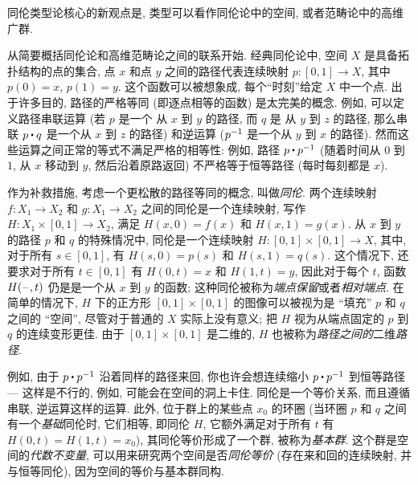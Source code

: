同伦类型论核心的新观点是, 类型可以看作同伦论中的空间, 或者范畴论中的高维广群.

从简要概括同伦论和高维范畴论之间的联系开始.
经典同伦论中, 空间 $X$ 是具备拓扑结构的点的集合,
%
%
点 $x$ 和点 $y$ 之间的路径代表连续映射 $p : [0,1] \to X$, 其中 $p(0) = x$, $p(1) = y$.
%
%
这个函数可以被想象成, 每个``时刻''给定 $X$ 中一个点.
出于许多目的, 路径的严格等同 (即逐点相等的函数) 是太完美的概念.
例如, 可以定义路径串联运算 (若 $p$ 是一个 从 $x$ 到 $y$ 的路径, 而 $q$ 是 从 $y$ 到 $z$ 的路径, 那么串联 $p \ct q$ 是一个从 $x$ 到 $z$ 的路径) 和逆运算 ($\mathord{{p}^{-1}}$ 是一个从 $y$ 到 $x$ 的路径).
然而这些运算之间正常的等式不满足严格的相等性: 例如, 路径 $p \ct \opp p$ (随着时间从 $0$ 到 $1$, 从 $x$ 移动到 $y$, 然后沿着原路返回) 不严格等于恒等路径 (每时每刻都是 $x$).

作为补救措施, 考虑一个更松散的路径等同的概念, 叫做\emph{同伦}.
两个连续映射 $f : X_1 \to X_2$ 和 $g : X_1\to X_2$ 之间的同伦是一个连续映射, 写作 $H : X_1 \times [0, 1] \to X_2$, 满足 $H(x, 0) = f (x)$ 和 $H(x, 1) = g(x)$.
从 $x$ 到 $y$ 的路径 $p$ 和 $q$ 的特殊情况中, 同伦是一个连续映射 $H : [0,1] \times [0,1] \rightarrow X$, 其中, 对于所有 $s\in [0,1]$, 有 $H(s,0) = p(s)$ 和 $H(s,1) = q(s)$.
这个情况下, 还要求对于所有 $t\in [0,1]$ 有 $H(0,t) = x$ 和 $H(1,t)=y$, 因此对于每个 $t$, 函数 $H(\mathord{\hspace{1pt}\text{--}\hspace{1pt}},t)$ 仍是是一个从 $x$ 到 $y$ 的函数;
这种同伦被称为\emph{端点保留}或者\emph{相对端点}.
在简单的情况下, $H$ 下的正方形 $[0,1]\times [0,1]$ 的图像可以被视为是 ``填充''  $p$ 和 $q$ 之间的 ``空间'', 尽管对于普通的 $X$ 实际上没有意义;
把 $H$ 视为从端点固定的 $p$ 到 $q$ 的连续变形更佳.
由于 $[0,1]\times [0,1]$ 是二维的, $H$ 也被称为\emph{路径之间的}二维\emph{路径}.

例如, 由于 $p \ct \opp p$ 沿着同样的路径来回, 你也许会想连续缩小 $p \ct \opp p$ 到恒等路径 --- 这样是不行的, 例如, 可能会在空间的洞上卡住.
同伦是一个等价关系, 而且遵循串联, 逆运算这样的运算.
此外, 位于群上的某些点 $x_0$ 的环圈 (当环圈 $p$ 和 $q$ 之间有一个\emph{基础}同伦时, 它们相等, 即同伦 $H$, 它额外满足对于所有 $t$ 有 $H(0,t) = H(1,t) = x_0$), 其同伦等价形成了一个群, 被称为\emph{基本群}.
%
这个群是空间的\emph{代数不变量}, 可以用来研究两个空间是否\emph{同伦等价} (存在来和回的连续映射, 并与恒等同伦), 因为空间的等价与基本群同构.

